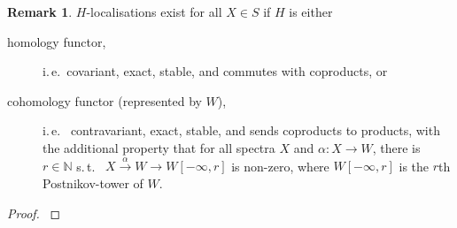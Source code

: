 \documentclass[english]{scrartcl}
\theoremstyle{definition}
\newtheorem*{Rem}{Remark}
\theoremstyle{remark}
\newcommand*{\idest}{i.\,e.\ }
\newcommand*{\suchthat}{s.\,t.\ }
\newcommand*{\N}{\mathds{N}}
\begin{document}
\begin{Rem}
  $H$-localisations exist for all $X\in S$ if $H$ is either
  \begin{description}
  \item[homology functor,] \idest covariant, exact, stable, and commutes with
    coproducts, or
  \item[cohomology functor (represented by $W$),] \idest
    contravariant, exact, stable, and sends coproducts to products,
    with the additional property that for all spectra $X$ and
    $\alpha\colon X\to W$, there is $r\in\N$ \suchthat
    $X\xrightarrow{\alpha} W\to W[-\infty, r]$ is non-zero, where
    $W[-\infty,r]$ is the $r$th Postnikov-tower of $W$.
  \end{description}
  \begin{proof}
    \cite[Prop. 7.6, and Thm. 7.7]{margolis}
  \end{proof}
\end{Rem}
\end{document}
